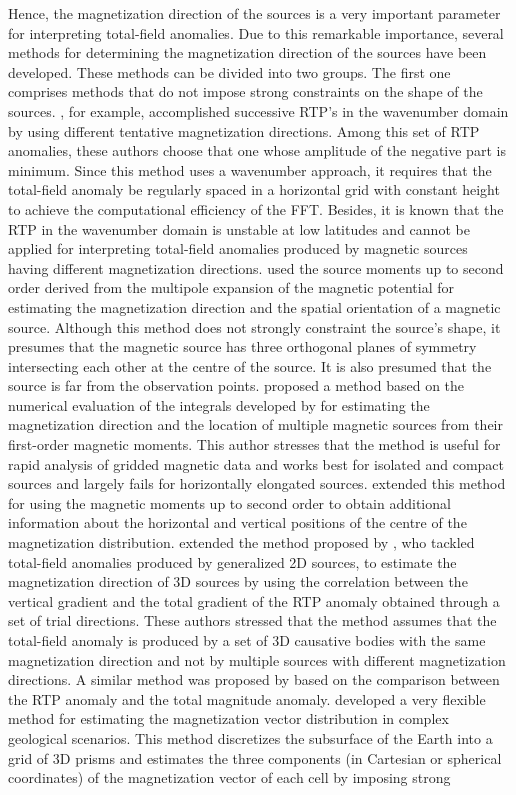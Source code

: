 \documentclass[journal abbreviation, npg]{copernicus}
\begin{document}
Hence, the magnetization direction of the sources is a very important parameter for interpreting total-field anomalies. Due to this remarkable importance, several methods for determining the magnetization direction of the sources have been developed. These methods can be divided into two groups. The first one comprises methods that do not impose strong constraints on the shape of the sources. \citet{fedi-etal1994}, for example, accomplished successive RTP's in the wavenumber domain by using different tentative magnetization directions. Among this set of RTP anomalies, these authors choose that one whose amplitude of the negative part is minimum. Since this method uses a wavenumber approach, it requires that the total-field anomaly be regularly spaced in a horizontal grid with constant height to achieve the computational efficiency of the FFT. Besides, it is known that the RTP in the wavenumber domain is unstable at low latitudes and cannot be applied for interpreting total-field anomalies produced by magnetic sources having different magnetization directions. \citet{medeiros-silva1995} used the source moments up to second order derived from the multipole expansion of the magnetic potential for estimating the magnetization direction and the spatial orientation of a magnetic source. Although this method does not strongly constraint the source's shape, it presumes that the magnetic source has three orthogonal planes of symmetry intersecting each other at the centre of the source. It is also presumed that the source is far from the observation points. \citet{phillips2005} proposed a method based on the numerical evaluation of the integrals developed by \citet{helbig1963} for estimating the magnetization direction and the location of multiple magnetic sources from their first-order magnetic moments. This author stresses that the method is useful for rapid analysis of gridded magnetic data and works best for isolated and compact sources and largely fails for horizontally elongated sources. \citet{tontini-pedersen2008} extended this method for using the magnetic moments up to second order to obtain additional information about the horizontal and vertical positions of the centre of the magnetization distribution. \citet{dannemiller-li2006} extended the method proposed by \citet{roest-pilkington1993}, who tackled total-field anomalies produced by generalized 2D sources, to estimate the magnetization direction of 3D sources by using the correlation between the vertical gradient and the total gradient of the RTP anomaly obtained through a set of trial directions. These authors stressed that the method assumes that the total-field anomaly is produced by a set of 3D causative bodies with the same magnetization direction and not by multiple sources with different magnetization directions. A similar method was proposed by \citet{gerovska-etal2009} based on the comparison between the RTP anomaly and the total magnitude anomaly. \citet{lelievre-oldenburg2009} developed a very flexible method for estimating the magnetization vector distribution in complex geological scenarios. This method discretizes the subsurface of the Earth into a grid of 3D prisms and estimates the three components (in Cartesian or spherical coordinates) of the magnetization vector of each cell by imposing strong 
\end{document}
